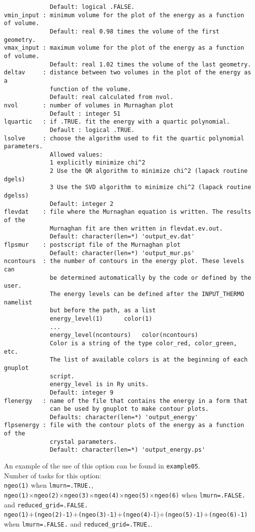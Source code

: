 \documentclass[12pt,a4paper]{article}
\begin{document}
\begin{verbatim}
             Default: logical .FALSE.
vmin_input : minimum volume for the plot of the energy as a function of volume.
             Default: real 0.98 times the volume of the first geometry.
vmax_input : maximum volume for the plot of the energy as a function of volume.
             Default: real 1.02 times the volume of the last geometry.
deltav     : distance between two volumes in the plot of the energy as a 
             function of the volume.
             Default: real calculated from nvol.
nvol       : number of volumes in Murnaghan plot
             Default : integer 51
lquartic   : if .TRUE. fit the energy with a quartic polynomial.
             Default : logical .TRUE.
lsolve     : choose the algorithm used to fit the quartic polynomial parameters.
             Allowed values:
             1 explicitly minimize chi^2
             2 Use the QR algorithm to minimize chi^2 (lapack routine dgels)
             3 Use the SVD algorithm to minimize chi^2 (lapack routine dgelss)
             Default: integer 2
flevdat    : file where the Murnaghan equation is written. The results of the
             Murnaghan fit are then written in flevdat.ev.out.
             Default: character(len=*) 'output_ev.dat'
flpsmur    : postscript file of the Murnaghan plot
             Default: character(len=*) 'output_mur.ps'
ncontours  : the number of contours in the energy plot. These levels can
             be determined automatically by the code or defined by the user.
             The energy levels can be defined after the INPUT_THERMO namelist 
             but before the path, as a list
             energy_level(1)      color(1)
             ...
             energy_level(ncontours)   color(ncontours) 
             Color is a string of the type color_red, color_green, etc.
             The list of available colors is at the beginning of each gnuplot
             script.
             energy_level is in Ry units.
             Default: integer 9
flenergy   : name of the file that contains the energy in a form that
             can be used by gnuplot to make contour plots.
             Defaults: character(len=*) 'output_energy'
flpsenergy : file with the contour plots of the energy as a function of the
             crystal parameters.
             Default: character(len=*) 'output_energy.ps'
\end{verbatim}
An example of the use of this option can be found in \texttt{example05}.\\
Number of tasks for this option: \\
\texttt{ngeo(1)} when \texttt{lmurn=.TRUE.}, \\
\texttt{ngeo(1)}$\times$\texttt{ngeo(2)}$\times$\texttt{ngeo(3)}$\times$\texttt{ngeo(4)}$\times$\texttt{ngeo(5)}$\times$\texttt{ngeo(6)} when 
\texttt{lmurn=.FALSE.} and \texttt{reduced\_grid=.FALSE.}\\
\texttt{ngeo(1)}$+$\texttt{(ngeo(2)-1)}$+$\texttt{(ngeo(3)-1)}$+$\texttt{(ngeo(4)}-1)$+$\texttt{(ngeo(5)-1)}$+$\texttt{(ngeo(6)-1)} when 
\texttt{lmurn=.FALSE.} and \texttt{reduced\_grid=.TRUE.}.
\end{document}
